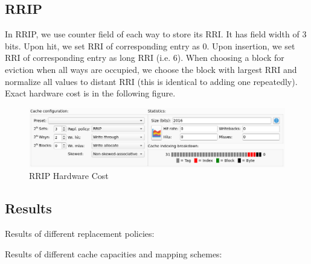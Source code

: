 \documentclass[utf8]{article}
\begin{document}
\subsection{RRIP}
In RRIP, we use counter field of each way to store its RRI. It has field width of 3 bits. Upon hit, we set RRI of corresponding entry as 0. Upon insertion, we set RRI of corresponding entry as long RRI (i.e. 6). When choosing a block for eviction when all ways are occupied, we choose the block with largest RRI and normalize all values to distant RRI (this is identical to adding one repeatedly). Exact hardware cost is in the following figure.
\begin{figure}[h]
	\centering
	\includegraphics[width=0.7\linewidth]{screenshot003}
	\caption{RRIP Hardware Cost}
	\label{fig:screenshot003}
\end{figure}

\subsection{Results}
Results of different replacement policies:
\newline

\newline

\noindent
Results of different cache capacities and mapping schemes:
\newline
\end{document}
